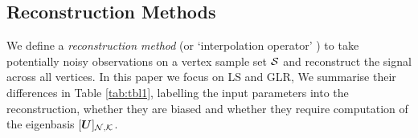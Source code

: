 \subsection{Reconstruction Methods}
We define a \emph{reconstruction method} (or `interpolation operator' \cite{chamon2017greedy}) to take potentially noisy observations on a vertex sample set $\mathcal{S}$ and reconstruct the signal across all vertices. In this paper we focus on LS and GLR, 
We summarise their differences in Table \ref{tab:tbl1}, labelling the input parameters into the reconstruction, whether they are biased and whether they require computation of the {\color{black}eigenbasis} $\matrsubU{N}$. 

